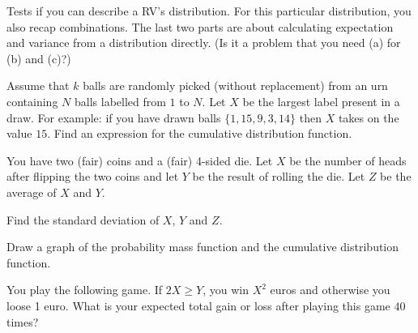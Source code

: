 \documentclass[a4paper,10pt,landscape,twocolumn]{scrartcl}
\begin{document}
\begin{exercise}
\begin{mycomment}
	Tests if you can describe a RV's distribution. For this particular distribution, you also recap combinations. The last two parts are about calculating expectation and variance from a distribution directly. (Is it a problem that you need (a) for (b) and (c)?)
\end{mycomment}

Assume that $k$ balls are randomly picked (without replacement) from an urn containing $N$ balls labelled from $1$ to $N$. Let $X$ be the largest label present in a draw. For example: if you have drawn balls $\{1, 15, 9, 3, 14\}$ then $X$ takes on the value $15$. Find an expression for the cumulative distribution function.
\end{exercise}


\begin{exercise}
You have two (fair) coins and a (fair) 4-sided die. Let $X$ be the number of heads after flipping the two coins and let $Y$ be the result of rolling the die. Let $Z$ be the average of $X$ and $Y$.

	\begin{subex}[1.5pt]
	Find the standard deviation of $X$, $Y$ and $Z$.	
	\end{subex}
	
	\begin{subex}[1pt]
	Draw a graph of the probability mass function and the cumulative distribution function.
	\end{subex}
	
	\begin{subex}[1.5pt]
	You play the following game. If $2X \ge Y$, you win $X^2$ euros and otherwise you loose 1 euro. What is your expected total gain or loss after playing this game $40$ times?
	\end{subex}
\end{exercise}


%
\end{document}
